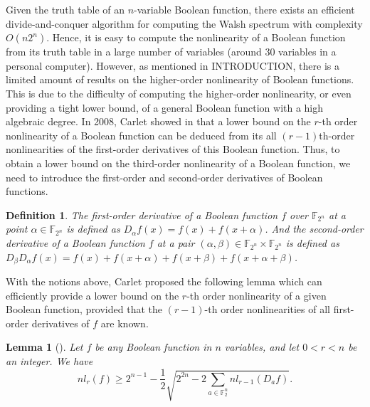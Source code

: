 \documentclass[preprint,10pt]{elsarticle}
\newcommand{\F}{\mathbb{F}}
\newcommand{\0}{\textbf{0}}
\newcommand{\1}{\textbf{1}}
\theoremstyle{plain}
\newtheorem{lemma}{Lemma}
\newtheorem{definition}{Definition}
\begin{document}
    Given the truth table of an $n$-variable Boolean function, there exists an efficient divide-and-conquer algorithm for computing the Walsh spectrum with complexity $O(n2^n)$. 
    Hence, it is easy to compute the nonlinearity of a Boolean function from its truth table in a large number of variables (around $30$ variables in a personal computer).
    However, as mentioned in INTRODUCTION, there is a limited amount of results on the higher-order nonlinearity of Boolean functions. 
    This is due to the difficulty of computing the higher-order nonlinearity, or even providing a tight lower bound, of a general Boolean function with a high algebraic degree.
    In 2008, Carlet showed in \cite{Carlet2008lowbound_NL_profile} that a lower bound on the $r$-th order nonlinearity of a Boolean function can be deduced from its all $(r-1)$th-order nonlinearities of the first-order derivatives of this Boolean function.
    Thus, to obtain a lower bound on the third-order nonlinearity of a Boolean function, we need to introduce the first-order and second-order derivatives of Boolean functions.
    \begin{definition}
        The first-order derivative of a Boolean function $f$ over $\F_{2^n}$ at a point $\alpha\in\F_{2^n}$ is defined as $D_{\alpha}f(x)=f(x)+f(x+\alpha)$.
        And the second-order derivative of a Boolean function $f$ at a pair $(\alpha,\beta)\in\F_{2^n}\times\F_{2^n}$ is defined as $D_{\beta}D_{\alpha}f(x)=f(x)+f(x+\alpha)+f(x+\beta)+f(x+\alpha+\beta)$.
    \end{definition}
    With the notions above, Carlet proposed the following lemma which can efficiently provide a lower bound on the $r$-th order nonlinearity of a given Boolean function,
    provided that the $(r-1)$-th order nonlinearities of all first-order derivatives of $f$ are known.
    \begin{lemma}[\cite{Carlet2008lowbound_NL_profile}]\label{thm:High_order_nl_bound1}
        Let $f$ be any Boolean function in $n$ variables, and let $0<r<n$ be an integer.
        We have
        \[nl_r(f)\ge 2^{n-1}-\frac{1}{2}\sqrt{2^{2n}-2\sum_{a\in\F_2^n}nl_{r-1}(D_af)}.\]
    \end{lemma}
\end{document}
